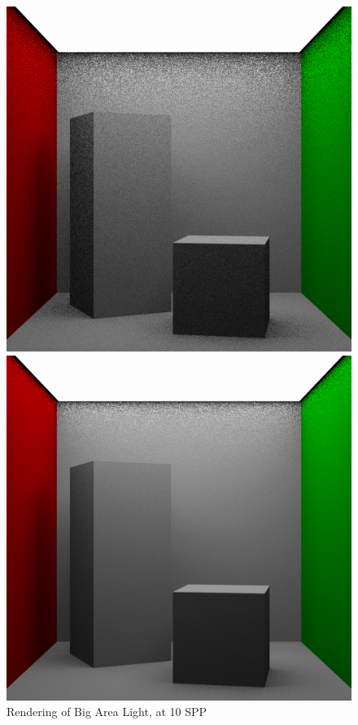 \documentclass[a4paper]{myarticle}
\begin{document}
\begin{figure}[H]
  \begin{minipage}[t]{.3\textwidth}
      \centering
      \includegraphics[width=\textwidth]{q3/big_2_10.png}
      \caption{Rendering of Big Area Light, at 10 SPP}
  \end{minipage}
  \hfill
  \begin{minipage}[t]{.3\textwidth}
      \centering
      \includegraphics[width=\textwidth]{q3/big_2_100.png}

\end{minipage}
\end{figure}
\end{document}
